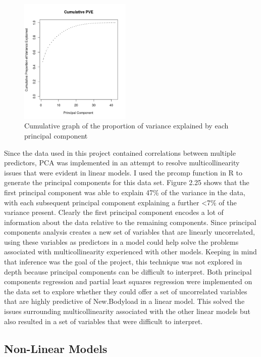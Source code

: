 \begin{figure}
	\vspace{-1em}
	\includegraphics[height=6cm]{Images/CumulativePVEPCA.png}
	\caption{Cumulative graph of the proportion of variance explained by each principal component}
\end{figure}
Since the data used in this project contained correlations between multiple predictors, PCA was implemented in an attempt to resolve multicollinearity issues that were evident in linear models. I used the prcomp function in R to generate the principal components for this data set. Figure 2.25 shows that the first principal component was able to explain 47\% of the variance in the data, with each subsequent principal component explaining a further \textless 7\% of the variance present. Clearly the first principal component encodes a lot of information about the data relative to the remaining components. Since principal components analysis creates a new set of variables that are linearly uncorrelated, using these variables as predictors in a model could help solve the problems associated with multicollinearity experienced with other models. Keeping in mind that inference was the goal of the project, this technique was not explored in depth because principal components can be difficult to interpret. Both principal components regression and partial least squares regression were implemented on the data set to explore whether they could offer a set of uncorrelated variables that are highly predictive of New.Bodyload in a linear model. This solved the issues surrounding multicollinearity associated with the other linear models but also resulted in a set of variables that were difficult to interpret.

\subsection{Non-Linear Models}
